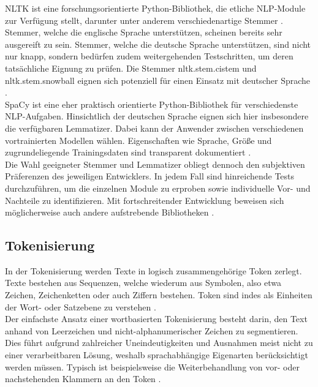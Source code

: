 \noindent
\ac{NLTK} ist eine forschungsorientierte Python-Bibliothek, die etliche \ac{NLP}-Module zur Verfügung stellt, darunter unter anderem verschiedenartige Stemmer \cite[S.~13-14]{BIR09}. Stemmer, welche die englische Sprache unterstützen, scheinen bereits sehr ausgereift zu sein. Stemmer, welche die deutsche Sprache unterstützen, sind nicht nur knapp, sondern bedürfen zudem weitergehenden Testschritten, um deren tatsächliche Eignung zu prüfen. Die Stemmer nltk.stem.cistem und nltk.stem.snowball eignen sich potenziell für einen Einsatz mit deutscher Sprache \cite{NLT20}.\\

\noindent
SpaCy ist eine eher praktisch orientierte Python-Bibliothek für verschiedenste \ac{NLP}-Aufgaben. Hinsichtlich der deutschen Sprache eignen sich hier insbesondere die verfügbaren Lemmatizer. Dabei kann der Anwender zwischen verschiedenen vortrainierten Modellen wählen. Eigenschaften wie Sprache, Größe und zugrundeliegende Trainingsdaten sind transparent dokumentiert \cite{SPA21}.\\

\noindent
Die Wahl geeigneter Stemmer und Lemmatizer obliegt dennoch den subjektiven Präferenzen des jeweiligen Entwicklers. In jedem Fall sind hinreichende Tests durchzuführen, um die einzelnen Module zu erproben sowie individuelle Vor- und Nachteile zu identifizieren. Mit fortschreitender Entwicklung beweisen sich möglicherweise auch andere aufstrebende Bibliotheken \cite[S.~108]{BIR09}.
\newpage


\subsection{Tokenisierung}
\noindent
In der Tokenisierung werden Texte in logisch zusammengehörige Token zerlegt. Texte bestehen aus Sequenzen, welche wiederum aus Symbolen, also etwa Zeichen, Zeichenketten oder auch Ziffern bestehen. Token sind indes als Einheiten der Wort- oder Satzebene zu verstehen \cite[S.~22-24]{MAN08}.\\

\noindent
Der einfachste Ansatz einer wortbasierten Tokenisierung besteht darin, den Text anhand von Leerzeichen und nicht-alphanumerischer Zeichen zu segmentieren. Dies führt aufgrund zahlreicher Uneindeutigkeiten und Ausnahmen meist nicht zu einer verarbeitbaren Lösung, weshalb sprachabhängige Eigenarten berücksichtigt werden müssen. Typisch ist beispielsweise die Weiterbehandlung von vor- oder nachstehenden Klammern an den Token \cite[S.~109-111]{BIR09}.\\


